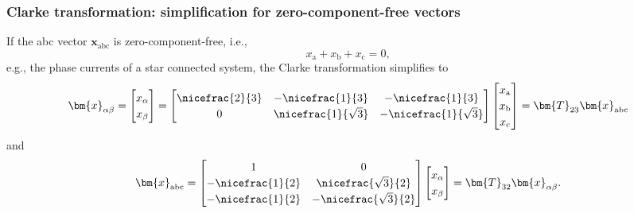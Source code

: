 \begin{frame}
	\frametitle{Clarke transformation: simplification for zero-component-free vectors}
    If the abc vector $\bm{x}_\mathrm{abc}$ is zero-component-free, i.e.,  $$x_\mathrm{a} + x_\mathrm{b} +x_\mathrm{c} = 0,$$
    e.g., the phase currents of a star connected system, \pause the Clarke transformation simplifies to
    \begin{equation}
        \renewcommand{\arraystretch}{1.2}
        \bm{x}_{\alpha \beta} = \begin{bmatrix} x_\alpha \\ x_\beta \end{bmatrix} = \begin{bmatrix}
            \nicefrac{2}{3} & -\nicefrac{1}{3} & -\nicefrac{1}{3}\\
            0 & \nicefrac{1}{\sqrt{3}} & -\nicefrac{1}{\sqrt{3}}
        \end{bmatrix} \begin{bmatrix} x_\mathrm{a} \\ x_\mathrm{b} \\ x_\mathrm{c}\end{bmatrix} = \bm{T}_{23} \bm{x}_\mathrm{abc}
        \label{eq:Clarke_transformation_zero_component_free}
    \end{equation}
    \pause
    and
    \begin{equation}
        \renewcommand{\arraystretch}{1.2}
        \bm{x}_\mathrm{abc}  = \begin{bmatrix}
            1 & 0\\
            -\nicefrac{1}{2} & \nicefrac{\sqrt{3}}{2}\\
            -\nicefrac{1}{2} & -\nicefrac{\sqrt{3}}{2}
        \end{bmatrix} \begin{bmatrix} x_\alpha \\ x_\beta \end{bmatrix} = \bm{T}_{32} \bm{x}_{\alpha \beta}.
    \end{equation}     
\end{frame}

